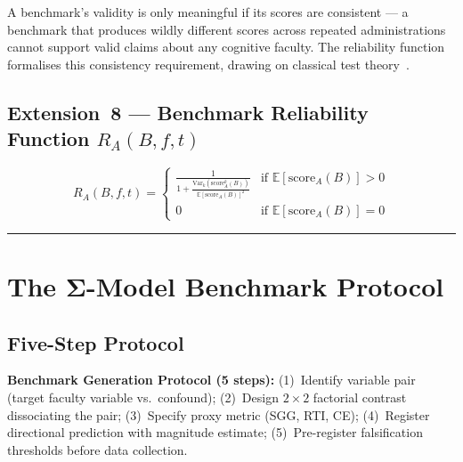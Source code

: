 A benchmark's validity is only meaningful if its scores are consistent --- a benchmark that produces wildly different scores across repeated administrations cannot support valid claims about any cognitive faculty. The reliability function formalises this consistency requirement, drawing on classical test theory~\citep{crocker1986introduction}.

\subsection{Extension~8 --- Benchmark Reliability Function \texorpdfstring{$R_A(B,f,t)$}{R\_A(B,f,t)}}\label{sec:reliability-fn}

\begin{equation}\label{eq:reliability}
R_A(B,f,t) = \begin{cases} \displaystyle\frac{1}{1 + \frac{\text{Var}_k(\text{score}_A^k(B))}{\mathbb{E}[\text{score}_A(B)]^2}} & \text{if } \mathbb{E}[\text{score}_A(B)] > 0 \\[8pt] 0 & \text{if } \mathbb{E}[\text{score}_A(B)] = 0 \end{cases}
\end{equation}

\noindent\rule{\linewidth}{0.4pt}


\section{The Σ-Model Benchmark Protocol}\label{sec:benchmark-protocol}

\subsection{Five-Step Protocol}\label{sec:five-step}

\textbf{Benchmark Generation Protocol (5 steps):}
(1)~Identify variable pair (target faculty variable vs.\ confound);
(2)~Design $2{\times}2$ factorial contrast dissociating the pair;
(3)~Specify proxy metric (SGG, RTI, CE);
(4)~Register directional prediction with magnitude estimate;
(5)~Pre-register falsification thresholds before data collection.

